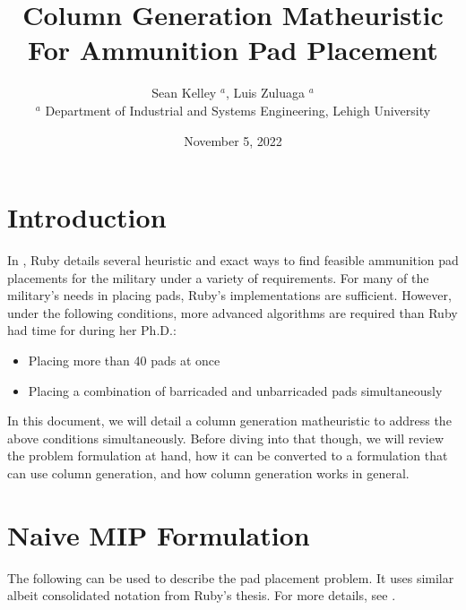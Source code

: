 \documentclass[10pt]{article}
\begin{document}
	\title{Column Generation Matheuristic For Ammunition Pad Placement}
	\author{Sean Kelley $^a$, Luis Zuluaga $ ^a $ \\
		$^a$ Department of Industrial and Systems Engineering, Lehigh University}
	\date{November 5, 2022}
	\maketitle

	\section{Introduction}
	In \cite{ruby}, Ruby details several heuristic and exact ways to find feasible ammunition pad placements for the military under a variety of requirements. For many of the military's needs in placing pads, Ruby's implementations are sufficient. However, under the following conditions, more advanced algorithms are required than Ruby had time for during her Ph.D.:
	\begin{itemize}
		\item Placing more than 40 pads at once
		\item Placing a combination of barricaded and unbarricaded pads simultaneously
	\end{itemize}
	In this document, we will detail a column generation matheuristic to address the above conditions simultaneously. Before diving into that though, we will review the problem formulation at hand, how it can be converted to a formulation that can use column generation, and how column generation works in general.
	
	\section{Naive MIP Formulation}
	The following can be used to describe the pad placement problem. It uses similar albeit consolidated notation from Ruby's thesis. For more details, see \cite{ruby}.
\end{document}
